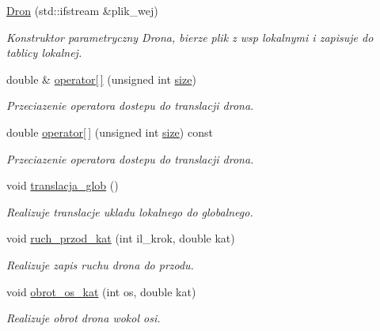 \begin{DoxyCompactItemize}
\item 
\hyperlink{class_dron_a2a8365d22ed2630eec325588f0a99ae9}{Dron} (std\+::ifstream \&plik\+\_\+wej)
\begin{DoxyCompactList}\small\item\em Konstruktor parametryczny Drona, bierze plik z wsp lokalnymi i zapisuje do tablicy lokalnej. \end{DoxyCompactList}\item 
double \& \hyperlink{class_dron_a1f9510601178cdc3aa0db072fe2e6ce2}{operator\mbox{[}$\,$\mbox{]}} (unsigned int \hyperlink{class_powierzchnia_a9ec2cb128f77750a89995e8065fee3c4}{size})
\begin{DoxyCompactList}\small\item\em Przeciazenie operatora dostepu do translacji drona. \end{DoxyCompactList}\item 
double \hyperlink{class_dron_a95002d53f1714a63b5ff6f272e5ef462}{operator\mbox{[}$\,$\mbox{]}} (unsigned int \hyperlink{class_powierzchnia_a9ec2cb128f77750a89995e8065fee3c4}{size}) const
\begin{DoxyCompactList}\small\item\em Przeciazenie operatora dostepu do translacji drona. \end{DoxyCompactList}\item 
void \hyperlink{class_dron_a8deb760c65a10cf414b77602d11e0c66}{translacja\+\_\+glob} ()
\begin{DoxyCompactList}\small\item\em Realizuje translacje ukladu lokalnego do globalnego. \end{DoxyCompactList}\item 
void \hyperlink{class_dron_aa46e419441838e4bdd770396a45cc437}{ruch\+\_\+przod\+\_\+kat} (int il\+\_\+krok, double kat)
\begin{DoxyCompactList}\small\item\em Realizuje zapis ruchu drona do przodu. \end{DoxyCompactList}\item 
void \hyperlink{class_dron_aa2c1af271cff349fbb66b0e88d6b367f}{obrot\+\_\+os\+\_\+kat} (int os, double kat)
\begin{DoxyCompactList}\small\item\em Realizuje obrot drona wokol osi. \end{DoxyCompactList}\end{DoxyCompactItemize}
